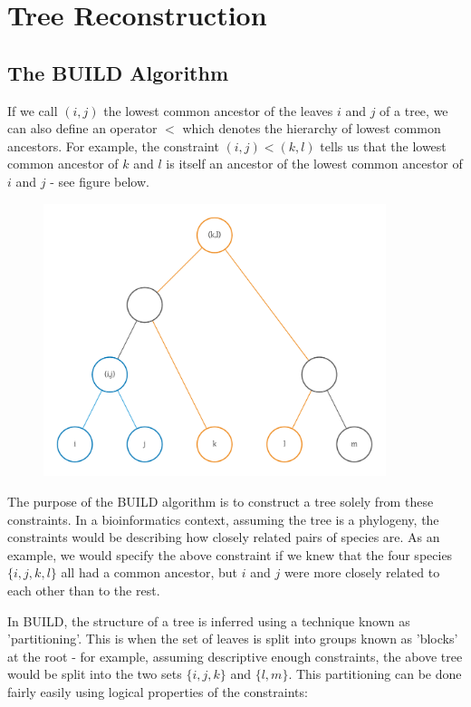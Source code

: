 \documentclass[11pt]{article} %
\begin{document}
\section{Tree Reconstruction}

\subsection{The BUILD Algorithm}
If we call $(i,j)$ the lowest common ancestor of the leaves $i$ and $j$ of a tree, we can also define an operator $<$ which denotes the hierarchy of lowest common ancestors. For example, the constraint $(i,j)<(k,l)$ tells us that the lowest common ancestor of $k$ and $l$ is itself an ancestor of the lowest common ancestor of $i$ and $j$ - see figure below.

\begin{figure}
	\centering
	\includegraphics[width=10cm]{buildexample}
\end{figure}

The purpose of the BUILD algorithm is to construct a tree solely from these constraints. In a bioinformatics context, assuming the tree is a phylogeny, the constraints would be describing how closely related pairs of species are. As an example, we would specify the above constraint if we knew that the four species $\{i,j,k,l\}$ all had a common ancestor, but $i$ and $j$ were more closely related to each other than to the rest.

In BUILD, the structure of a tree is inferred using a technique known as 'partitioning'. This is when the set of leaves is split into groups known as 'blocks' at the root - for example, assuming descriptive enough constraints, the above tree would be split into the two sets $\{i,j,k\}$ and $\{l,m\}$. This partitioning can be done fairly easily using logical properties of the constraints:
\end{document}

